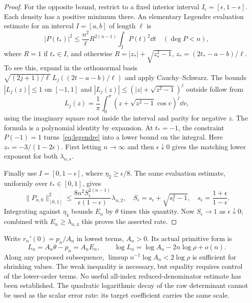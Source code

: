 \begin{proof}
For the opposite bound, restrict to a fixed interior interval
$I_\epsilon=[\epsilon,1-\epsilon]$.
Each density has a positive minimum there. An elementary Legendre
evaluation estimate for an interval $I=[a,b]$ of length $\ell$ is
\begin{equation}\label{eq:legendre}
 |P(t_*)|^2\leq\frac{n^2}{\ell}R^{2(n-1)}\int_I P(t)^2\dd t
       \quad(\deg P<n),
\end{equation}
where $R=1$ if $t_*\in I$, and otherwise
$R=|z_*|+\sqrt{z_*^2-1}$, $z_*=(2t_*-a-b)/\ell$.
To see this, expand in the orthonormal basis
$\sqrt{(2j+1)/\ell}\,L_j((2t-a-b)/\ell)$ and apply
Cauchy--Schwarz. The bounds $|L_j(z)|\leq1$ on $[-1,1]$ and
$|L_j(z)|\leq(|z|+\sqrt{z^2-1})^j$ outside follow from
\[
 L_j(z)=\frac1\pi\int_0^\pi
                (z+\sqrt{z^2-1}\cos v)^j\dd v,
\]
using the imaginary square root inside the interval and parity for
negative $z$. The formula is a polynomial identity by expansion.
At $t_*=-1$, the constraint $P(-1)=1$ turns~\eqref{eq:legendre}
into a lower bound on the integral. Here
$z_*=-3/(1-2\epsilon)$. First letting $n\to\infty$
and then $\epsilon\downarrow0$ gives the matching lower exponent
for both $\lambda_{n,s}$.

Finally use $I=[0,1-\epsilon]$, where $\eta_2\geq\epsilon/8$.
The same evaluation estimate, uniformly over $t_*\in[0,1]$, gives
\[
 \|P_{n,0}\|_{[0,1]}^2\leq
 \frac{8n^2S_\epsilon^{2(n-1)}}{\epsilon(1-\epsilon)}\lambda_{n,2},
 \quad
 S_\epsilon=s_\epsilon+\sqrt{s_\epsilon^2-1},\quad
 s_\epsilon=\frac{1+\epsilon}{1-\epsilon}.
\]
Integrating against $\eta_4$ bounds $E_n$ by $\theta$ times this
quantity. Now $S_\epsilon\to1$ as $\epsilon\downarrow0$; combined
with $E_n\geq\lambda_{n,4}$ this proves the asserted rate.
\end{proof}

Write $r_n'(0)=p_n/A_n$ in lowest terms, $A_n>0$. Its actual
primitive form is
\begin{equation}\label{eq:variation-budget}
 L_n=A_n\theta-p_n=A_nE_n,
 \qquad \log L_n=\log A_n-2n\log\rho+o(n).
\end{equation}
Along any proposed subsequence, $\limsup n^{-1}\log A_n<2\log\rho$
is sufficient for shrinking values. The weak inequality is necessary,
but equality requires control of the lower-order terms. No useful
all-index reduced-denominator estimate has been established. The
quadratic logarithmic decay of the raw determinant cannot be used as
the scalar error rate: its target coefficient carries the same scale.

